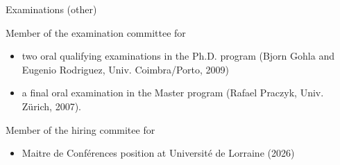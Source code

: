 \documentclass[12p]{resume}
\begin{document}
\begin{category}{Examinations (other)}
 

\citemnobullet Member of the examination committee  for
\begin{itemize}
\item  two oral qualifying examinations  in the Ph.D. program (Bjorn Gohla and Eugenio Rodriguez, Univ. Coimbra/Porto, 2009)
\item a final oral examination  in the Master program (Rafael Praczyk, Univ. Z\"urich, 2007).
\end{itemize}



\citemnobullet Member of the hiring commitee for
\begin{itemize}
\item Maitre de Conf\'erences position at Universit\'e de Lorraine (2026)
\end{itemize}



\end{category}
\end{document}
